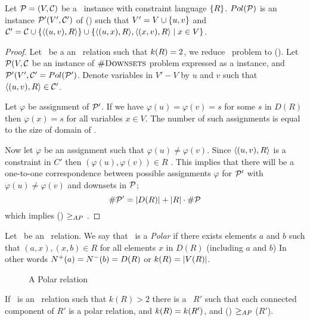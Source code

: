 \begin{defi} [\(Pol(G)\)]\label{def:pol}
Let \(\mathcal{P}=(V,\mathcal{C})\) be a \ccsp\ instance with constraint language  \(\{{R}\}\)\@.
\(Pol(\mathcal{P})\) is an instance \(\mathcal{P}'(V',\mathcal{C}')\) of \ccsp(\mR) such that
\(V' = V \cup \{{u,v}\}\) and \(\mathcal{C}' = \mathcal{C} \cup \{{\langle (u,v), R \rangle}\} \cup
\{{\langle (u,x), R \rangle, \langle (x,v),R \rangle \mid x \in V}\}\)\@.
\end{defi}

\begin{proof}
Let \mR\ be a an \RBA\ relation such that \(k(R)=2\), 
we reduce \cds\ problem to \ccsp(\mR)\@.
Let \(\mathcal{P}(V,\mathcal{C}\) be an instance of \(\textsc{\#Downsets}\) problem expressed as a \ccsp instance,
and \(\mathcal{P}'(V',\mathcal{C}' = Pol(\mathcal{P}')\)\@.
Denote variables in \(V'- V\) by \(u\) and \(v\) such that \(\langle (u,v),R \rangle\in \mathcal{C}'\)\@.

Let \(\varphi\) be assignment of \(\mathcal{P}'\)\@. If we have \(\varphi(u)=\varphi(v)=s\) 
for some \(s\) in \(D(R)\) then \(\varphi(x)=s\) for all variables \(x\in V\).
The number of such assignments is equal to the size of domain of \mR\@.

Now let \(\varphi\) be an assignment such that \(\varphi(u) \neq \varphi(v)\).
Since \(\langle (u,v),R \rangle\) is a constraint in \(C'\) then
\((\varphi(u),\varphi(v)) \in R\) \@.
This implies that there will be a one-to-one correspondence between possible assignments 
\(\varphi\) for \(\mathcal{P}'\) with \(\varphi(u) \neq \varphi(v)\)  and downsets in \(\mathcal{P}\)\@; 
\[\#\mathcal{P}' = |D(R)| + |R|\cdot \#\mathcal{P} \]
which implies \ccsp(\mR) \(\ge_{AP}\) \cds\@.
\end{proof}

\begin{defi} 
Let \mR\ be an \RBA\ relation. We say that \mR\ is a 
\emph{Polar} if there exists elements \(a\) and \(b\) 
such that \((a,x), (x,b) \in R\) for all elements \(x\) in \(D(R)\) (including \(a\) and \(b\))
In other words \(N^+(a) = N^-(b) = D(R)\) or \(k(R)=|V(R)|\)\@.
\end{defi}

\begin{figure}[h]
\center{}
\caption{A Polar relation}
\end{figure}

\begin{lemma} \label{lem:k-fixing}
If \mR\ is an \RBA\ relation  such that \(k(R) > 2\) there is a \RBA\ 
\(R'\) such that  each connected component of \(R'\) is a
polar relation, and \(k(R) = k(R')\), and
\ccsp(\mR) \(\ge_{AP}\) \ccsp(\(R'\)).
\end{lemma}

